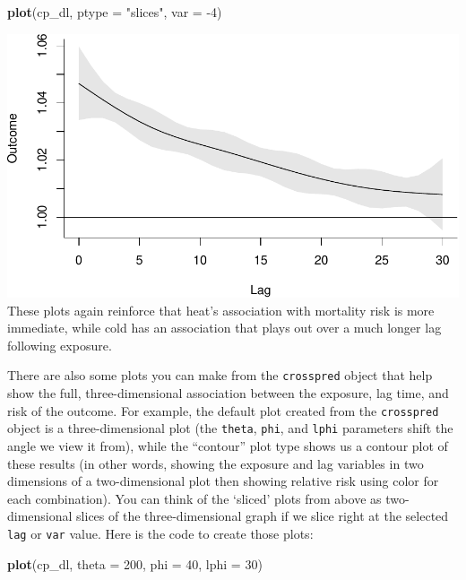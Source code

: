 \documentclass[
]{book}
\newenvironment{Shaded}{\begin{snugshade}}{\end{snugshade}}
\newcommand{\DataTypeTok}[1]{\textcolor[rgb]{0.13,0.29,0.53}{#1}}
\newcommand{\DecValTok}[1]{\textcolor[rgb]{0.00,0.00,0.81}{#1}}
\newcommand{\KeywordTok}[1]{\textcolor[rgb]{0.13,0.29,0.53}{\textbf{#1}}}
\newcommand{\NormalTok}[1]{#1}
\newcommand{\StringTok}[1]{\textcolor[rgb]{0.31,0.60,0.02}{#1}}
\begin{document}
\begin{Shaded}
\begin{Highlighting}[]
\KeywordTok{plot}\NormalTok{(cp_dl, }\DataTypeTok{ptype =} \StringTok{"slices"}\NormalTok{, }\DataTypeTok{var =} \DecValTok{-4}\NormalTok{)}
\end{Highlighting}
\end{Shaded}

\includegraphics{adv_epi_analysis_files/figure-latex/unnamed-chunk-106-2.pdf}
These plots again reinforce that heat's association with mortality risk is more immediate,
while cold has an association that plays out over a much longer lag following exposure.

There are also some plots you can make from the \texttt{crosspred} object that help show the full,
three-dimensional association between the exposure, lag time, and risk of the outcome.
For example, the default plot created from the \texttt{crosspred} object is a three-dimensional
plot (the \texttt{theta}, \texttt{phi}, and \texttt{lphi} parameters shift the angle we view it from), while
the ``contour'' plot type shows us a contour plot of these results (in other words, showing
the exposure and lag variables in two dimensions of a two-dimensional plot then showing
relative risk using color for each combination). You can think of the `sliced' plots from above as two-dimensional slices of the three-dimensional graph if we slice right at the selected \texttt{lag} or \texttt{var} value. Here is the code to create those plots:

\begin{Shaded}
\begin{Highlighting}[]
\KeywordTok{plot}\NormalTok{(cp_dl, }\DataTypeTok{theta =} \DecValTok{200}\NormalTok{, }\DataTypeTok{phi =} \DecValTok{40}\NormalTok{, }\DataTypeTok{lphi =} \DecValTok{30}\NormalTok{)}
\end{Highlighting}
\end{Shaded}
\end{document}
